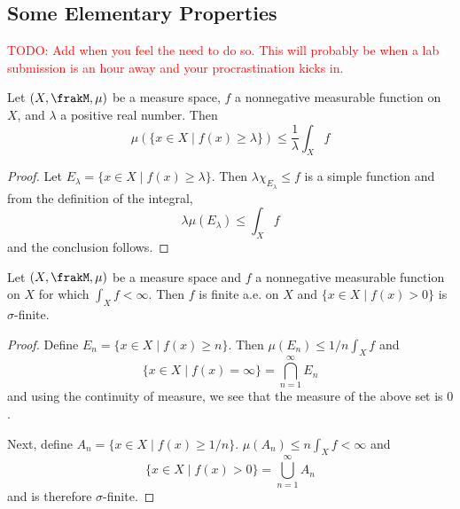 \subsection*{Some Elementary Properties}
\textcolor{red}{TODO: Add when you feel the need to do so. This will probably be when a lab submission is an hour away and your procrastination kicks in.}

\begin{theorem}
    Let $(X,\frakM,\mu)$ be a measure space, $f$ a nonnegative measurable function on $X$, and $\lambda$ a positive real number. Then 
    \begin{equation*}
        \mu\left(\{x\in X\mid f(x)\ge\lambda\}\right)\le\frac{1}{\lambda}\int_X f
    \end{equation*}
\end{theorem}
\begin{proof}
    Let $E_\lambda = \{x\in X\mid f(x)\ge\lambda\}$. Then $\lambda\chi_{E_\lambda}\le f$ is a simple function and from the definition of the integral, 
    \begin{equation*}
        \lambda\mu(E_\lambda)\le\int_X f
    \end{equation*}
    and the conclusion follows.
\end{proof}

\begin{proposition}
    Let $(X,\frakM,\mu)$ be a measure space and $f$ a nonnegative measurable function on $X$ for which $\int_X f < \infty$. Then $f$ is finite a.e. on $X$ and $\{x\in X\mid f(x) > 0\}$ is $\sigma$-finite.
\end{proposition}
\begin{proof}
    Define $E_n = \{x\in X\mid f(x)\ge n\}$. Then $\mu(E_n)\le 1/n\int_X f$ and 
    \begin{equation*}
        \{x\in X\mid f(x) = \infty\} = \bigcap_{n = 1}^\infty E_n
    \end{equation*}
    and using the continuity of measure, we see that the measure of the above set is $0$. 

    Next, define $A_n = \{x\in X\mid f(x)\ge 1/n\}$. $\mu(A_n)\le n\int_X f < \infty$ and 
    \begin{equation*}
        \{x\in X\mid f(x) > 0\} = \bigcup_{n = 1}^\infty A_n 
    \end{equation*}
    and is therefore $\sigma$-finite.
\end{proof}

